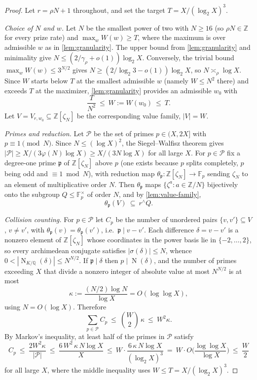 \documentclass[11pt]{article}
\theoremstyle{definition}
\newcommand{\F}{\mathbb F}
\newcommand{\Z}{\mathbb Z}
\newcommand{\Q}{\mathbb Q}
\newcommand{\Norm}{\operatorname{N}}
\begin{document}
\begin{proof}
Let $r=\rho N+1$ throughout, and set the target $T=X/(\log_2X)^3$.

\emph{Choice of $N$ and $w$.}  Let $N$ be the smallest power of two with $N\ge16$ (so $\rho N\in\Z$ for every prize rate) and $\max_wW(w)\ge T$, where the maximum is over admissible $w$ as in \cref{lem:granularity}.  The upper bound from \cref{lem:granularity} and minimality give $N\le(2/\gamma_\rho+o(1))\log_2X$.  Conversely, the trivial bound $\max_wW(w)\le 3^{N/2}$ gives $N\ge (2/\log_2 3-o(1))\log_2X$, so $N\asymp_\rho\log X$.  Since $W$ starts below $T$ at the smallest admissible $w$ (namely $W\le N^2$ there) and exceeds $T$ at the maximizer, \cref{lem:granularity} provides an admissible $w_0$ with
\[
        \frac{T}{N^2}\ \le\ W:=W(w_0)\ \le\ T .
\]
Let $V=V_{r,w_0}\subseteq\Z[\zeta_N]$ be the corresponding value family, $|V|=W$.

\emph{Primes and reduction.}  Let $\mathcal P$ be the set of primes $p\in(X,2X]$ with $p\equiv1\pmod N$.  Since $N\le(\log X)^2$, the Siegel--Walfisz theorem \cite{Davenport} gives $|\mathcal P|\ge X/(3\varphi(N)\log X)\ge X/(3N\log X)$ for all large $X$.  For $p\in\mathcal P$ fix a degree-one prime $\mathfrak p$ of $\Z[\zeta_N]$ above $p$ (one exists because $p$ splits completely, $p$ being odd and $\equiv1\bmod N$), with reduction map $\theta_{\mathfrak p}:\Z[\zeta_N]\to\F_p$ sending $\zeta_N$ to an element of multiplicative order $N$.  Then $\theta_{\mathfrak p}$ maps $\{\zeta^a:a\in\Z/N\}$ bijectively onto the subgroup $Q\le\F_p^\times$ of order $N$, and by \cref{lem:value-family},
\[
        \theta_{\mathfrak p}(V)\ \subseteq\ r^{\wedge}Q .
\]

\emph{Collision counting.}  For $p\in\mathcal P$ let $C_p$ be the number of unordered pairs $\{v,v'\}\subseteq V$, $v\ne v'$, with $\theta_{\mathfrak p}(v)=\theta_{\mathfrak p}(v')$, i.e.\ $\mathfrak p\mid v-v'$.  Each difference $\delta=v-v'$ is a nonzero element of $\Z[\zeta_N]$ whose coordinates in the power basis lie in $\{-2,\ldots,2\}$, so every archimedean conjugate satisfies $|\sigma(\delta)|\le N$, whence $0<|\Norm_{K/\Q}(\delta)|\le N^{N/2}$.  If $\mathfrak p\mid\delta$ then $p\mid\Norm(\delta)$, and the number of primes exceeding $X$ that divide a nonzero integer of absolute value at most $N^{N/2}$ is at most
\[
        \kappa:=\frac{(N/2)\log N}{\log X}=O(\log\log X),
\]
using $N=O(\log X)$.  Therefore
\[
        \sum_{p\in\mathcal P}C_p\ \le\ \binom W2\,\kappa\ \le\ W^2\kappa .
\]
By Markov's inequality, at least half of the primes in $\mathcal P$ satisfy
\[
        C_p\ \le\ \frac{2W^2\kappa}{|\mathcal P|}
        \ \le\ \frac{6\,W^2\,\kappa\,N\log X}{X}
        \ \le\ W\cdot\frac{6\,\kappa\,N\log X}{(\log_2X)^3}
        \ =\ W\cdot O\!\Big(\frac{\log\log X}{\log X}\Big)\ \le\ \frac W2
\]
for all large $X$, where the middle inequality uses $W\le T=X/(\log_2X)^3$.


\end{proof}
\end{document}
